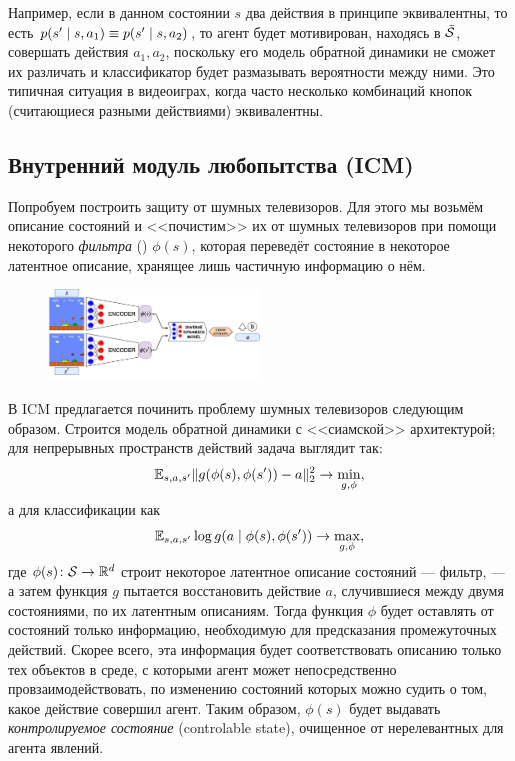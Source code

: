 \begin{example}
Например, если в данном состоянии $s$ два действия в принципе эквивалентны, то есть $p(s' \HM\mid s, a_1) \HM\equiv p(s' \HM\mid s, a_2)$, то агент будет мотивирован, находясь в $\tilde{\mathcal{S}}$, совершать действия $a_1, a_2$, поскольку его модель обратной динамики не сможет их различать и классификатор будет размазывать вероятности между ними. Это типичная ситуация в видеоиграх, когда часто несколько комбинаций кнопок (считающиеся разными действиями) эквивалентны.
\end{example}

\subsection{Внутренний модуль любопытства (ICM)}

Попробуем построить защиту от шумных телевизоров. Для этого мы возьмём описание состояний и <<почистим>> их от шумных телевизоров при помощи некоторого \emph{фильтра} () $\phi(s)$, которая переведёт состояние в некоторое латентное описание, хранящее лишь частичную информацию о нём.

\begin{figure}
\centering
\includegraphics[width=0.5\textwidth]{Images/inversemodel.png}
\vspace{-0.7cm}
\end{figure}

В ICM предлагается починить проблему шумных телевизоров следующим образом. Строится модель обратной динамики с <<сиамской>> архитектурой; для непрерывных пространств действий задача выглядит так:
$$\mathbb{E}_{s, a, s'} \|g(\phi(s), \phi(s')) - a\|^2_2 \to \min_{g, \phi},$$
а для классификации как
$$\mathbb{E}_{s, a, s'} \log g(a \mid \phi(s), \phi(s')) \to \max_{g, \phi},$$
где $\phi(s) \colon \mathcal{S} \to \mathbb{R}^d$ строит некоторое латентное описание состояний --- фильтр, --- а затем функция $g$ пытается восстановить действие $a$, случившиеся между двумя состояниями, по их латентным описаниям. Тогда функция $\phi$ будет оставлять от состояний только информацию, необходимую для предсказания промежуточных действий. Скорее всего, эта информация будет соответствовать описанию только тех объектов в среде, с которыми агент может непосредственно провзаимодействовать, по изменению состояний которых можно судить о том, какое действие совершил агент. Таким образом, $\phi(s)$ будет выдавать \emph{контролируемое состояние} (controlable state), очищенное от нерелевантных для агента явлений.

